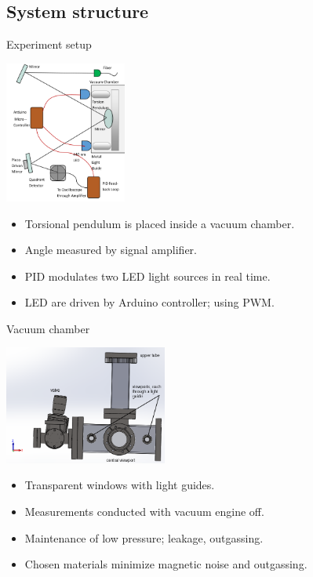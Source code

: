 \documentclass{beamer}
\begin{document}
\subsection{System structure}
\begin{frame}{Experiment setup}
	\begin{center}		
			\includegraphics[width=0.3\textwidth,keepaspectratio]{setup cropped.png}
	\end{center}
	\begin{itemize}

		\item Torsional pendulum is placed inside a vacuum chamber. 
		\item Angle measured by signal amplifier.
		\item PID modulates two LED light sources in real time.
		\item LED are driven by Arduino controller; using PWM.
	
	\end{itemize}
	
\end{frame}

\begin{frame}{Vacuum chamber}
	\begin{center}		
		\includegraphics[width=0.4\textwidth,keepaspectratio]{chamber_front_names.PNG}
	\end{center}
	\begin{itemize}
		\item Transparent windows with light guides.
		\item Measurements conducted with vacuum engine off.
		\item Maintenance of low pressure; leakage, outgassing.
		\item Chosen materials minimize magnetic noise and outgassing.

		
	\end{itemize}	
\end{frame}
\end{document}
